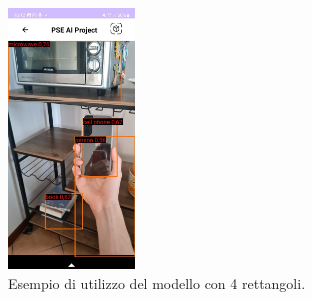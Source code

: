 \begin{figure}
    \centering
    \includegraphics[width=0.3\textwidth]{Immagini/App/funzionamento_4rettangoli.jpeg}
    \caption{Esempio di utilizzo del modello con 4 rettangoli.}
    \label{fig:funzionamento2}
\end{figure}